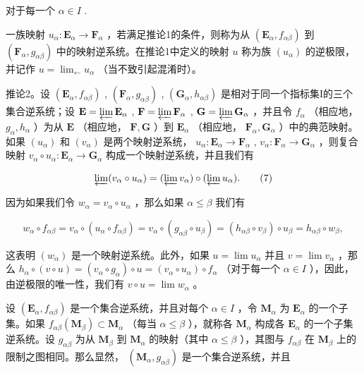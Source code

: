 对于每一个 \(\alpha \in I\) .

一族映射 \(u_{\alpha}: \mathbf{E}_{\alpha} \to \mathbf{F}_{\alpha}\) ，若满足推论1的条件，则称为从 \((\mathbf{E}_{\alpha}, f_{\alpha\beta})\) 到 \((\mathbf{F}_{\alpha}, g_{\alpha\beta})\) 中的映射逆系统。在推论1中定义的映射 \(u\) 称为族 \((u_{\alpha})\) 的逆极限，并记作 \(u = \lim_{\leftarrow} u_{\alpha}\) （当不致引起混淆时）。

推论2。设 \((\mathbf{E}_{\alpha}, f_{\alpha \beta})\) , \((\mathbf{F}_{\alpha}, g_{\alpha \beta})\) , \((\mathbf{G}_{\alpha}, h_{\alpha \beta})\) 是相对于同一个指标集I的三个集合逆系统；设 \(\mathbf{E} = \varprojlim \mathbf{E}_{\alpha}\) , \(\mathbf{F} = \varprojlim \mathbf{F}_{\alpha}\) , \(\mathbf{G} = \varprojlim \mathbf{G}_{\alpha}\) ，并且令 \(f_{\alpha}\) （相应地， \(g_{\alpha}, h_{\alpha}\) ）为从 \(\mathbf{E}\) （相应地， \(\mathbf{F}, \mathbf{G}\) ）到 \(\mathbf{E}_{\alpha}\) （相应地， \(\mathbf{F}_{\alpha}, \mathbf{G}_{\alpha}\) ）中的典范映射。如果 \((u_{\alpha})\) 和 \((v_{\alpha})\) 是两个映射逆系统， \(u_{\alpha}: \mathbf{E}_{\alpha} \to \mathbf{F}_{\alpha}\) , \(v_{\alpha}: \mathbf{F}_{\alpha} \to \mathbf{G}_{\alpha}\) ，则复合映射 \(v_{\alpha} \circ u_{\alpha}: \mathbf{E}_{\alpha} \to \mathbf{G}_{\alpha}\) 构成一个映射逆系统，并且我们有

\[
\varprojlim (v _ {\alpha} \circ u _ {\alpha}) = (\varprojlim v _ {\alpha}) \circ (\varprojlim u _ {\alpha}).\tag{7}
\]

因为如果我们令 \(w_{\alpha} = v_{\alpha} \circ u_{\alpha}\) ，那么如果 \(\alpha \leqslant \beta\) 我们有

\[
w _ {\alpha} \circ f _ {\alpha \beta} = v _ {\alpha} \circ (u _ {\alpha} \circ f _ {\alpha \beta}) = v _ {\alpha} \circ (g _ {\alpha \beta} \circ u _ {\beta}) = (h _ {\alpha \beta} \circ v _ {\beta}) \circ u _ {\beta} = h _ {\alpha \beta} \circ w _ {\beta},
\]

这表明 \((w_{\alpha})\) 是一个映射逆系统。此外，如果 \(u = \lim u_{\alpha}\) 并且 \(v = \lim v_{\alpha}\) ，那么 \(h_{\alpha} \circ (v \circ u) = (v_{\alpha} \circ g_{\alpha}) \circ u = (v_{\alpha} \circ u_{\alpha}) \circ f_{\alpha}\) （对于每一个 \(\alpha \in I\) ），因此，由逆极限的唯一性，我们有 \(v \circ u = \lim w_{\alpha}\) 。

设 \((\mathbf{E}_{\alpha}, f_{\alpha \beta})\) 是一个集合逆系统，并且对每个 \(\alpha \in I\) ，令 \(\mathbf{M}_{\alpha}\) 为 \(\mathbf{E}_{\alpha}\) 的一个子集。如果 \(f_{\alpha \beta}(\mathbf{M}_{\beta}) \subset \mathbf{M}_{\alpha}\) （每当 \(\alpha \leqslant \beta\) ），就称各 \(\mathbf{M}_{\alpha}\) 构成各 \(\mathbf{E}_{\alpha}\) 的一个子集逆系统。设 \(g_{\alpha \beta}\) 为从 \(\mathbf{M}_{\beta}\) 到 \(\mathbf{M}_{\alpha}\) 的映射（其中 \(\alpha \leqslant \beta\) ），其图与 \(f_{\alpha \beta}\) 在 \(\mathbf{M}_{\beta}\) 上的限制之图相同。那么显然， \((\mathbf{M}_{\alpha}, g_{\alpha \beta})\) 是一个集合逆系统，并且

